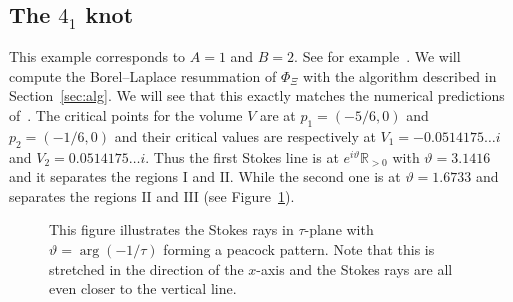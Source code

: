 \documentclass[12pt,reqno]{amsart}
\theoremstyle{definition}
\def\BR{\mathbb R}
\renewcommand{\=}{\;=\;}
\begin{document}
\subsection{\texorpdfstring{The $4_1$ knot}{The 4\_1 knot}}\label{sec:4_1}
This example corresponds to $A=1$ and $B=2$. See for example~\cite[Sec.~7]{GSW}. We will compute the Borel--Laplace resummation of $\Phi_\Xi$ with the algorithm described in Section~\ref{sec:alg}. We will see that this exactly matches the numerical predictions of~\cite{GGM:I}. The critical points for the volume $V$ are at $p_1=(-5/6,0)$ and $p_2=(-1/6,0)$ and their critical values are respectively at $V_1=-0.0514175\ldots i$ and $V_2=0.0514175\ldots i$. Thus the first Stokes line is at $e^{i\vartheta}\BR_{>0}$ with $\vartheta=3.1416$ and it separates the regions $\mathrm{I}$ and $\mathrm{II}$. While the second one is at $\vartheta=1.6733$ and separates the regions $\mathrm{II}$ and $\mathrm{III}$ (see Figure~\ref{fig:41.stokes}).
\begin{figure}[ht]
\begin{tiny}
\end{tiny}
\caption{This figure illustrates the Stokes rays in $\tau$-plane with $\vartheta=\arg(-1/\tau)$ forming a peacock pattern. Note that this is stretched in the direction of the $x$-axis and the Stokes rays are all even closer to the vertical line.}\label{fig:41.stokes}
\end{figure}
\end{document}
